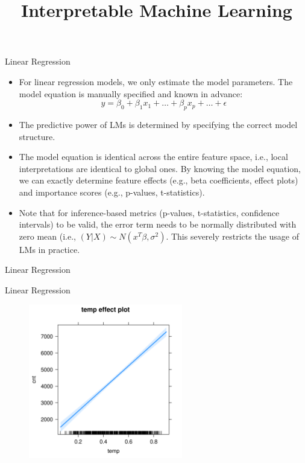 \documentclass[11pt,compress,t,notes=noshow, xcolor=table]{beamer}
\title{Interpretable Machine Learning}
\institute{\href{https://compstat-lmu.github.io/lecture_iml/}{compstat-lmu.github.io/lecture\_iml}}
\date{}
\begin{document}


\newcommand{\titlefigure}{figure/open_blackbox}
\newcommand{\learninggoals}{
\item Examples for interpretable models: (generalized) linear models, generalized additive models, model-based boosting}


\begin{vbframe}{Linear Regression}

\begin{itemize}
\item For linear regression models, we only estimate the model parameters. The model equation is manually specified and known in advance:
$$
y = \beta_0 + \beta_1 x_1 + \dots + \beta_p x_p + \dots + \epsilon
$$
\item The predictive power of LMs is determined by specifying the correct model structure.
\item The model equation is identical across the entire feature space, i.e., local interpretations are identical to global ones. By knowing the model equation, we can exactly determine feature effects (e.g., beta coefficients, effect plots) and importance scores (e.g., p-values, t-statistics).
\item Note that for inference-based metrics (p-values, t-statistics, confidence intervals) to be valid, the error term needs to be normally distributed with zero mean (i.e., $(Y \vert X) \sim N(x^T\beta, \sigma^2)$. This severely restricts the usage of LMs in practice.
\end{itemize}
\end{vbframe}

\begin{vbframe}{Linear Regression}
\tiny

\end{vbframe}

\begin{vbframe}{Linear Regression}
\begin{figure}
  \includegraphics[width = 0.6\textwidth]{figure/lm_effect_plot.png}
\end{figure}
\end{vbframe}
\end{document}
